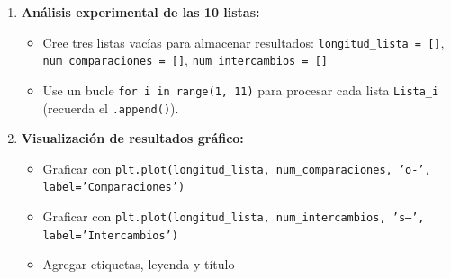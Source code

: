 \documentclass[10pt]{article}
\begin{document}
\begin{tcolorbox}[title={Pregunta 3 – Análisis de Complejidad del Algoritmo Bubble Sort}]
\begin{enumerate}
  \item \textbf{Análisis experimental de las 10 listas:}
  \begin{itemize}
    \item Cree tres listas vacías para almacenar resultados: \texttt{longitud\_lista = []}, \texttt{num\_comparaciones = []}, \texttt{num\_intercambios = []}
    \item Use un bucle \texttt{for i in range(1, 11)} para procesar cada lista \texttt{Lista\_i} (recuerda el \texttt{.append()}).
  \end{itemize}
    
  \item \textbf{Visualización de resultados gráfico:}
  \begin{itemize}
    \item Graficar con \texttt{plt.plot(longitud\_lista, num\_comparaciones, 'o-', label='Comparaciones')}
    \item Graficar con \texttt{plt.plot(longitud\_lista, num\_intercambios, 's--', label='Intercambios')}
    \item Agregar etiquetas, leyenda y título
  \end{itemize}
  
\end{enumerate}



\end{tcolorbox}
\end{document}
